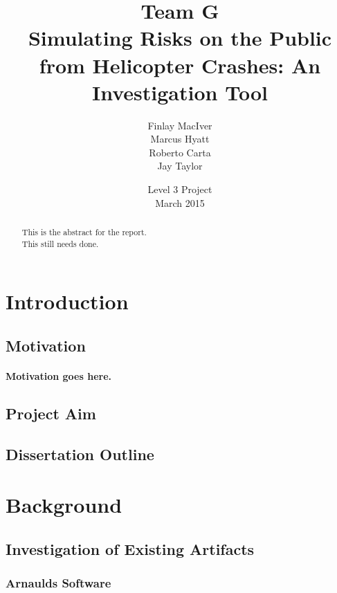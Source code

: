\documentclass[12pt,a4paper, titlepage]{article}
\begin{document}
\title{Team G \\ \vspace{10mm} Simulating Risks on the Public from Helicopter Crashes: An Investigation Tool}

\author{Finlay MacIver
		\\Marcus Hyatt
		\\Roberto Carta
		\\Jay Taylor}
		
\date{Level 3 Project \\ March 2015}
\maketitle

\begin{abstract}
This is the abstract for the report. \\ This still needs done.
\end{abstract}

\tableofcontents
\pagebreak

\section{Introduction}

\subsection{Motivation}
\paragraph{Motivation goes here.}
\subsection{Project Aim}
\subsection{Dissertation Outline}

\section{Background}

\subsection{Investigation of Existing Artifacts}
\subsubsection{Arnaulds Software}
\end{document}
